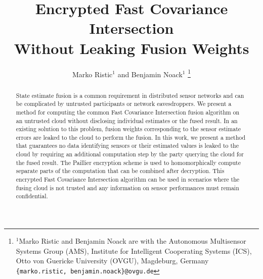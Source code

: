 \documentclass[letterpaper, 10 pt, conference]{ieeeconf}
\title{\LARGE \bf
Encrypted Fast Covariance Intersection\\Without Leaking Fusion Weights
}
\author{Marko Ristic$^{1}$ and Benjamin Noack$^{1}$%
\thanks{$^{1}$Marko Ristic and Benjamin Noack are with the Autonomous Multisensor Systems Group (AMS), Institute for Intelligent Cooperating Systems (ICS), Otto von Guericke University (OVGU), Magdeburg, Germany {\tt\small \{marko.ristic, benjamin.noack\}@ovgu.de}}%
}
\begin{document}
\maketitle
\thispagestyle{empty}
\pagestyle{empty}

% 
%                                    
%                                    
%                                    
% 
\begin{abstract}
    State estimate fusion is a common requirement in distributed sensor networks and can be complicated by untrusted participants or network eavesdroppers. We present a method for computing the common Fast Covariance Intersection fusion algorithm on an untrusted cloud without disclosing individual estimates or the fused result. In an existing solution to this problem, fusion weights corresponding to the sensor estimate errors are leaked to the cloud to perform the fusion. In this work, we present a method that guarantees no data identifying sensors or their estimated values is leaked to the cloud by requiring an additional computation step by the party querying the cloud for the fused result. The Paillier encryption scheme is used to homomorphically compute separate parts of the computation that can be combined after decryption. This encrypted Fast Covariance Intersection algorithm can be used in scenarios where the fusing cloud is not trusted and any information on sensor performances must remain confidential.
\end{abstract}


% 
%                                                        
%                                                        
%                                                        
% 
\end{document}
